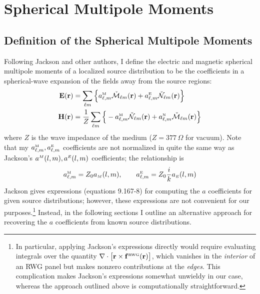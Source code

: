 \documentclass[letterpaper]{article}
\begin{document}
\section{Spherical Multipole Moments}

\subsection*{Definition of the Spherical Multipole Moments}

Following Jackson and other authors, I define the 
electric and magnetic spherical multipole moments of a localized source 
distribution to be the coefficients in a spherical-wave
expansion of the fields away from the source regions:
\begin{subequations}
\begin{align}
 \mathbf{E}(\mathbf{r}) &= \sum_{\ell m} \Big\{  a^{\hbox{\tiny{M}}}_{\ell,m} \check{\mathcal{M}}_{\ell m}(\mathbf{r})
                                      +a^{\hbox{\tiny{E}}}_{\ell,m} \check{\mathcal{N}}_{\ell m}(\mathbf{r})
                               \Big\}
\\
 \mathbf{H}(\mathbf{r}) &= \frac{1}{Z}
                 \sum_{\ell m} \Big\{ -a^{\hbox{\tiny{M}}}_{\ell,m} \check{\mathcal{N}}_{\ell m}(\mathbf{r})
                                      +a^{\hbox{\tiny{N}}}_{\ell,m} \check{\mathcal{M}}_{\ell m}(\mathbf{r})
                               \Big\}
\end{align}
\label{SphericalMultipoleDefinitions}
\end{subequations}
where $Z$ is the wave impedance of the medium ($Z=377\,\Omega$ for vacuum).
Note that my $a^{\hbox{\tiny{M}}}_{\ell,m}, a^{\hbox{\tiny{E}}}_{\ell,m}$ coefficients
are not normalized in quite the same way as Jackson's
$a^{\hbox{\tiny{$M$}}}(l,m), a^{\hbox{\tiny{$E$}}}(l,m)$ coefficients; 
the relationship is 
$$ a^{\hbox{\tiny{M}}}_{\ell,m} = Z_0 a_{\hbox{\tiny{$M$}}}(l,m), \qquad 
   a^{\hbox{\tiny{E}}}_{\ell,m} = Z_0 \frac{i}{k} a_{\hbox{\tiny{$E$}}}(l,m)
$$
Jackson gives expressions (equations 9.167-8) for computing 
the $a$ coefficients for given source distributions; however, 
these expressions are not convenient for our 
purposes.\footnote{In particular, applying Jackson's expressions
directly would require evaluating integrals over the quantity 
$\nabla\cdot \big[\mathbf{r} \times \mathbf{f}^{\hbox{\tiny{RWG}}}(\mathbf{r})\big]$,
which vanishes in the \textit{interior} of an RWG panel but makes
nonzero contributions at the \textit{edges}. This complication
makes Jackson's expressions somewhat unwieldy in our case, 
whereas the approach outlined above is computationally 
straightforward.} Instead, in the following sections I outline
an alternative approach for recovering the $a$ coefficients
from known source distributions.
\end{document}
